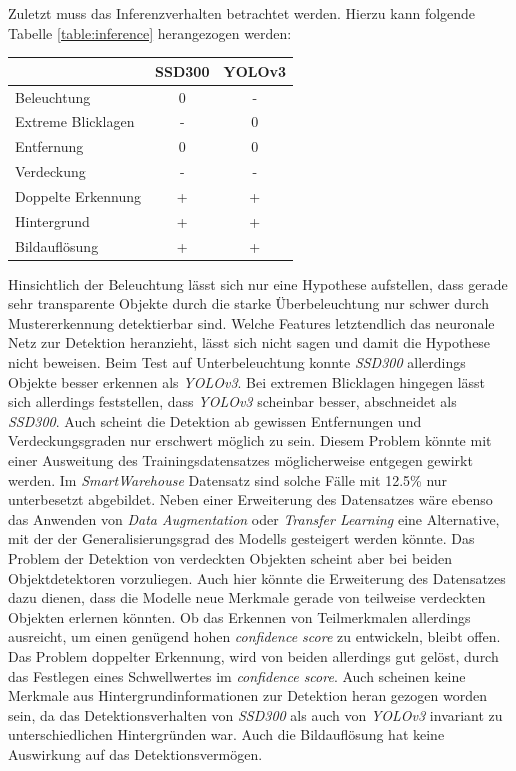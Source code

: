Zuletzt muss das Inferenzverhalten betrachtet werden. Hierzu kann folgende Tabelle \ref{table:inference} herangezogen werden:

\begin{center}
	\begin{tabular}[h]{l|c|c}
		 & SSD300 & YOLOv3 \\
		\hline
		Beleuchtung & 0 & - \\
		Extreme Blicklagen & - & 0 \\
		Entfernung & 0 & 0 \\
		Verdeckung & - & - \\
		Doppelte Erkennung & + & + \\
		Hintergrund & + & + \\
		Bildauflösung & + & + \\
	\end{tabular}
	\label{table:inference}
\end{center}

Hinsichtlich der Beleuchtung lässt sich nur eine Hypothese aufstellen, dass gerade sehr transparente Objekte durch die starke Überbeleuchtung nur schwer durch Mustererkennung detektierbar sind. Welche Features letztendlich das neuronale Netz zur Detektion heranzieht, lässt sich nicht sagen und damit die Hypothese nicht beweisen. Beim Test auf Unterbeleuchtung konnte \textit{SSD300} allerdings Objekte besser erkennen als \textit{YOLOv3}. Bei extremen Blicklagen hingegen lässt sich allerdings feststellen, dass \textit{YOLOv3} scheinbar besser, abschneidet als \textit{SSD300}. Auch scheint die Detektion ab gewissen Entfernungen und Verdeckungsgraden nur erschwert möglich zu sein. Diesem Problem könnte mit einer Ausweitung des Trainingsdatensatzes möglicherweise entgegen gewirkt werden. Im \textit{SmartWarehouse} Datensatz sind solche Fälle mit 12.5\% nur unterbesetzt abgebildet. Neben einer Erweiterung des Datensatzes wäre ebenso das Anwenden von \textit{Data Augmentation} oder \textit{Transfer Learning} eine Alternative, mit der der Generalisierungsgrad des Modells gesteigert werden könnte. Das Problem der Detektion von verdeckten Objekten scheint aber bei beiden Objektdetektoren vorzuliegen. Auch hier könnte die Erweiterung des Datensatzes dazu dienen, dass die Modelle neue Merkmale gerade von teilweise verdeckten Objekten erlernen könnten. Ob das Erkennen von Teilmerkmalen allerdings ausreicht, um einen genügend hohen \textit{confidence score} zu entwickeln, bleibt offen. Das Problem doppelter Erkennung, wird von beiden allerdings gut gelöst, durch das Festlegen eines Schwellwertes im \textit{confidence score}. Auch scheinen keine Merkmale aus Hintergrundinformationen zur Detektion heran gezogen worden sein, da das Detektionsverhalten von \textit{SSD300} als auch von \textit{YOLOv3} invariant zu unterschiedlichen Hintergründen war. Auch die Bildauflösung hat keine Auswirkung auf das Detektionsvermögen.

